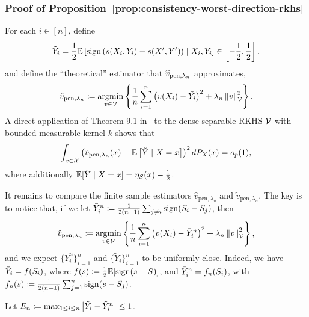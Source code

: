 \subsubsection{Proof of Proposition~\ref{prop:consistency-worst-direction-rkhs}}
\label{sec:proof-consistency-worst-direction-rkhs}
For each $i \in [n]$,  define
\begin{align*}
\tilde{Y}_i =  \frac{1}{2} \mathbb{E}\left[ \mathop{\rm sign}\left( s(X_i,Y_i) - s(X', Y') \right) \mid X_i,Y_i \right] \in \left[-\frac{1}{2}, \frac{1}{2} \right],
\end{align*}
and define the ``theoretical'' estimator that $\widehat{v}_{\text{pen},
  \lambda_n}$ approximates,
\begin{align*}
  \tilde{v}_{\text{pen}, \lambda_n} \coloneqq \mathop{\rm argmin}_{v \in \mathcal{V}} \left\{ \frac{1}{n}\sum_{i=1}^n \left( v(X_i) - \tilde{Y_i} \right)^2 + \lambda_n \left\|{v}\right\|_{\mathcal{V}}^2 \right\}.
\end{align*}
A direct application of Theorem 9.1 in~\citet{SteinwartCh08} to the dense separable RKHS $\mathcal{V}$ with bounded measurable kernel $k$ shows that
\begin{align}
\label{eqn:rkhs-erm-convergence}
\int_{x \in \mathcal{X}} \left( \tilde{v}_{\text{pen}, \lambda_n}(x) - \mathbb{E}\left[ \tilde{Y} \mid X=x \right] \right)^2 dP_X(x) = o_p(1),
\end{align}
where additionally $\mathbb{E}[ \tilde{Y} \mid X=x] = \eta_S(x) - \frac{1}{2}$.

It remains to compare the finite sample estimators $\hat{v}_{\text{pen},
  \lambda_n}$ and $\tilde{v}_{\text{pen}, \lambda_n}$.  The key is to notice
that, if we let $\bar{Y}_i^n \coloneqq \frac{1}{2(n-1)}\sum_{j \neq i}
\mathop{\rm sign}(S_i - S_j)$, then
\begin{align*}
\hat{v}_{\text{pen}, \lambda_n}  \coloneqq \mathop{\rm argmin}_{v \in \mathcal{V}} \left\{ \frac{1}{n}\sum_{i=1}^n \left( v(X_i) - \bar{Y}_i^n \right)^2 + \lambda_n \left\|{v}\right\|_{\mathcal{V}}^2 \right\}, 
\end{align*}
and we expect $\{ \bar{Y}_i^n \}_{i=1}^n$ and $\{ \tilde{Y}_i \}_{i=1}^n$ to
be uniformly close.  Indeed, we have $\tilde{Y}_i = f(S_i)$, where
$f(s) \coloneqq \frac{1}{2} \mathbb{E}[ \mathop{\rm sign}(s - S)]$, and $\bar{Y}_i ^n =
f_n(S_i)$, with $f_n(s) \coloneqq \frac{1}{2(n-1)} \sum_{j=1}^n \mathop{\rm sign}(s
- S_j)$.

Let $E_n \coloneqq \max_{1 \le i \le n} \left| \tilde{Y}_i - \tilde{Y}_i^n
\right| \le 1$.

